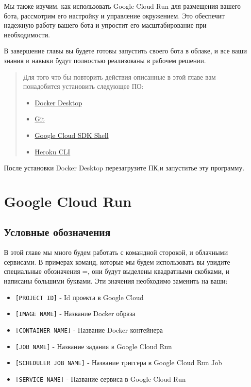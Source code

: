 \documentclass[
]{book}
\providecommand{\tightlist}{%
  \setlength{\itemsep}{0pt}\setlength{\parskip}{0pt}}
\begin{document}
Мы также изучим, как использовать Google Cloud Run для размещения вашего бота, рассмотрим его настройку и управление окружением. Это обеспечит надежную работу вашего бота и упростит его масштабирование при необходимости.

В завершение главы вы будете готовы запустить своего бота в облаке, и все ваши знания и навыки будут полностью реализованы в рабочем решении.

\begin{quote}
Для того что бы повторить действия описанные в этой главе вам понадобится установить следующее ПО:

\begin{itemize}
\tightlist
\item
  \href{https://www.docker.com/products/docker-desktop/}{Docker Desktop}
\item
  \href{https://git-scm.com/downloads}{Git}
\item
  \href{https://cloud.google.com/sdk/docs/install-sdk}{Google Cloud SDK Shell}
\item
  \href{https://devcenter.heroku.com/articles/heroku-cli\#install-the-heroku-cli}{Heroku CLI}
\end{itemize}
\end{quote}

После установки Docker Desktop перезагрузите ПК,и запуститье эту программу.

\section{Google Cloud Run}\label{google-cloud-run}

\subsection{Условные обозначения}\label{ux443ux441ux43bux43eux432ux43dux44bux435-ux43eux431ux43eux437ux43dux430ux447ux435ux43dux438ux44f}

В этой главе мы много будем работать с командной сторокой, и облачными сервисами. В примерах команд, которые мы будем использовать вы увидите специальные обозначения =, они будут выделены квадратными скобками, и написаны большими буквами. Эти значения необходимо заменить на ваши:

\begin{itemize}
\tightlist
\item
  \texttt{{[}PROJECT\ ID{]}} - Id проекта в Google Cloud
\item
  \texttt{{[}IMAGE\ NAME{]}} - Название Docker образа
\item
  \texttt{{[}CONTAINER\ NAME{]}} - Название Docker контейнера
\item
  \texttt{{[}JOB\ NAME{]}} - Название задания в Google Cloud Run
\item
  \texttt{{[}SCHEDULER\ JOB\ NAME{]}} - Название триггера в Google Cloud Run Job
\item
  \texttt{{[}SERVICE\ NAME{]}} - Название сервиса в Google Cloud Run
\end{itemize}
\end{document}
